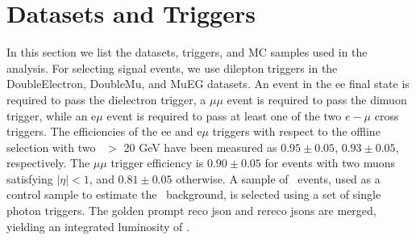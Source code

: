 \clearpage

\section{Datasets and Triggers}
\label{sec:datasets}

In this section we list the datasets, triggers, and MC samples used in the analysis. For selecting signal
events, we use dilepton triggers in the DoubleElectron, DoubleMu, and MuEG datasets. 
An event in the ee final state is required to pass the dielectron trigger, a 
$\mu\mu$ event is required to pass the dimuon trigger, while an e$\mu$ event is required to pass at least one 
of the two $e-\mu$ cross triggers. The efficiencies of the ee and e$\mu$ triggers with respect to the
offline selection with two \pt\ $>$ 20 GeV have been measured as $0.95\pm0.05$, $0.93\pm0.05$, respectively.
The $\mu\mu$ trigger efficiency is $0.90\pm0.05$ for events with two muons satisfying $|\eta|<1$, and $0.81\pm0.05$ otherwise.
A sample of \gjets\ events, used as a control sample to estimate the \zjets\
background, is selected using a set of single photon triggers.
The golden prompt reco json and rereco jsons are merged, yielding an integrated luminosity of \lumi.

